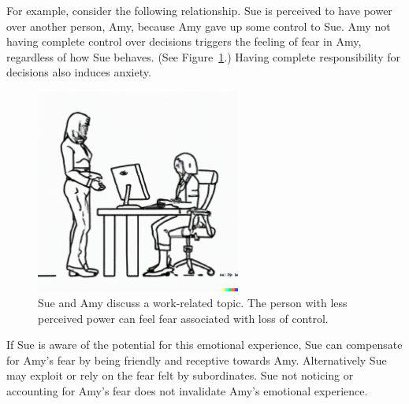 For example, consider the following relationship. Sue is perceived to have power over another person, Amy, because Amy gave up some control to Sue. Amy not having complete control over decisions triggers the feeling of fear in Amy, regardless of how Sue behaves. (See Figure~\ref{fig:subordinate_and_supervisor}.) Having complete responsibility for decisions also induces anxiety.

\begin{figure}[H]
    \centering
\includegraphics[width=0.6\textwidth,trim={0 1cm 0 0},clip]{images/female_supervisor_standing_while_talking_to_seated_female_employee_typing_on_keyboard.pdf}
    \caption{Sue and Amy discuss a work-related topic. The person with less perceived power can feel fear associated with loss of control.}
    \label{fig:subordinate_and_supervisor}
\end{figure}



If Sue is aware of the potential for this emotional experience, Sue can compensate for Amy's fear by being friendly and receptive towards Amy. Alternatively Sue may exploit or rely on the fear felt by subordinates. Sue not noticing or accounting for Amy's fear does not invalidate Amy's emotional experience.





